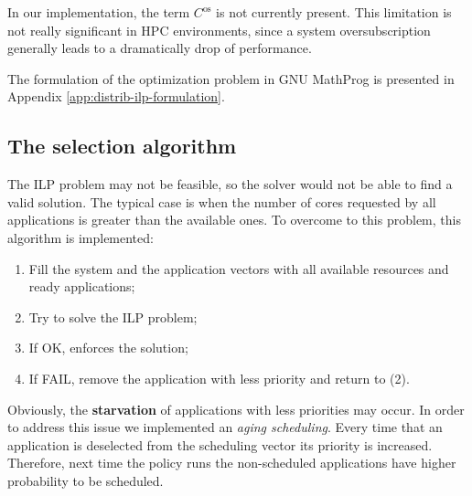 In our implementation, the term \(C^{\text{os}}\) is not currently present.
This limitation is not really significant in HPC environments, since a
system oversubscription generally leads to a dramatically drop of performance.

The formulation of the optimization problem in GNU MathProg is presented in
Appendix \ref{app:distrib-ilp-formulation}.

\subsection{The selection algorithm}
The ILP problem may not be feasible, so the solver would not be
able to find a valid solution.
The typical case is when the number of cores requested by all applications is
greater than the available ones. To overcome to this problem, this algorithm
is implemented:
\begin{enumerate}
\item Fill the system and the application vectors with all available resources and ready applications;
\item Try to solve the ILP problem;
\item If OK, enforces the solution;
\item If FAIL, remove the application with less priority and return to (2).
\end{enumerate}

Obviously, the \textbf{starvation} of applications with less priorities
may occur. In order to address this issue we implemented an \emph{aging scheduling}. Every time that an application is
deselected from the scheduling vector its priority is increased. Therefore,
next time the policy runs the non-scheduled applications have higher
probability to be scheduled.
